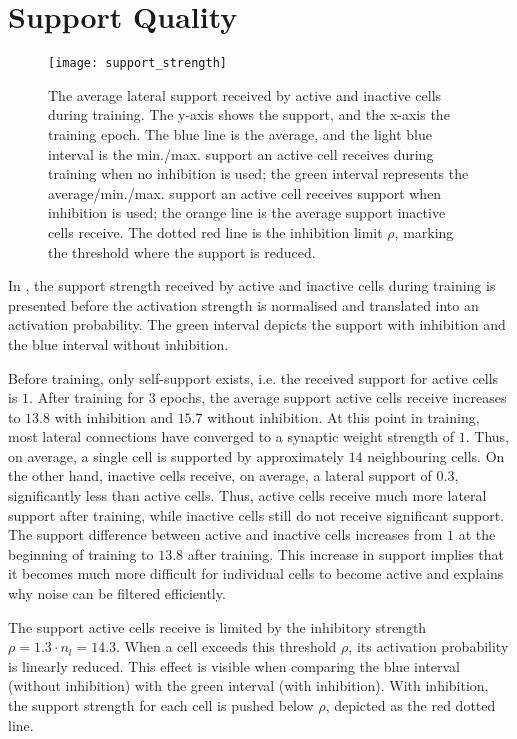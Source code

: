 \section{Support Quality}
%
\begin{figure}[h]
    \centering
    \texttt{[image: support\_strength]}
    \caption[Average lateral support]{The average lateral support received by active and inactive cells during training. The y-axis shows the support, and the x-axis the training epoch. The blue line is the average, and the light blue interval is the min./max. support an active cell receives during training when no inhibition is used; the green interval represents the average/min./max. support an active cell receives support when inhibition is used; the orange line is the average support inactive cells receive. The dotted red line is the inhibition limit $\rho$, marking the threshold where the support is reduced.}
\end{figure}
%
In , the support strength received by active and inactive cells during training is presented before the activation strength is normalised and translated into an activation probability.
The green interval depicts the support with inhibition and the blue interval without inhibition.

Before training, only self-support exists, i.e. the received support for active cells is $1$.
After training for $3$ epochs, the average support active cells receive increases to $13.8$ with inhibition and $15.7$ without inhibition.
At this point in training, most lateral connections have converged to a synaptic weight strength of $1$.
Thus, on average, a single cell is supported by approximately $14$ neighbouring cells.
On the other hand, inactive cells receive, on average, a lateral support of $0.3$, significantly less than active cells.
Thus, active cells receive much more lateral support after training, while inactive cells still do not receive significant support.
The support difference between active and inactive cells increases from $1$ at the beginning of training to $13.8$ after training.
This increase in support implies that it becomes much more difficult for individual cells to become active and explains why noise can be filtered efficiently.

The support active cells receive is limited by the inhibitory strength $\rho = 1.3\cdot n_l = 14.3$.
When a cell exceeds this threshold $\rho$, its activation probability is linearly reduced.
This effect is visible when comparing the blue interval (without inhibition) with the green interval (with inhibition). With inhibition, the support strength for each cell is pushed below $\rho$, depicted as the red dotted line.

